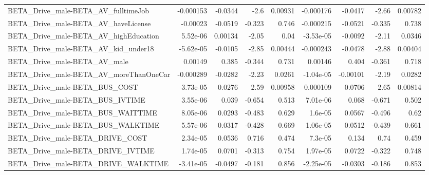 \begin{tabular}{lrrrrrrrr}
BETA\_Drive\_male-BETA\_AV\_fulltimeJob                &   -0.000153 &      -0.0344 &      -2.6 &  0.00931 &  -0.000176 &     -0.0417 &        -2.66 &       0.00782 \\
BETA\_Drive\_male-BETA\_AV\_haveLicense                &    -0.00023 &      -0.0519 &    -0.323 &    0.746 &  -0.000215 &     -0.0521 &       -0.335 &         0.738 \\
BETA\_Drive\_male-BETA\_AV\_highEducation              &    5.52e-06 &      0.00134 &     -2.05 &     0.04 &  -3.53e-05 &     -0.0092 &        -2.11 &        0.0346 \\
BETA\_Drive\_male-BETA\_AV\_kid\_under18                &   -5.62e-05 &      -0.0105 &     -2.85 &  0.00444 &  -0.000243 &     -0.0478 &        -2.88 &       0.00404 \\
BETA\_Drive\_male-BETA\_AV\_male                       &     0.00149 &        0.385 &    -0.344 &    0.731 &    0.00146 &       0.404 &       -0.361 &         0.718 \\
BETA\_Drive\_male-BETA\_AV\_moreThanOneCar             &   -0.000289 &      -0.0282 &     -2.23 &   0.0261 &  -1.04e-05 &    -0.00101 &        -2.19 &        0.0282 \\
BETA\_Drive\_male-BETA\_BUS\_COST                      &    3.73e-05 &       0.0276 &      2.59 &  0.00958 &   0.000109 &      0.0706 &         2.65 &       0.00814 \\
BETA\_Drive\_male-BETA\_BUS\_IVTIME                    &    3.55e-06 &        0.039 &    -0.654 &    0.513 &   7.01e-06 &       0.068 &       -0.671 &         0.502 \\
BETA\_Drive\_male-BETA\_BUS\_WAITTIME                  &    8.05e-06 &       0.0293 &    -0.483 &    0.629 &    1.6e-05 &      0.0567 &       -0.496 &          0.62 \\
BETA\_Drive\_male-BETA\_BUS\_WALKTIME                  &    5.57e-06 &       0.0317 &    -0.428 &    0.669 &   1.06e-05 &      0.0512 &       -0.439 &         0.661 \\
BETA\_Drive\_male-BETA\_DRIVE\_COST                    &    2.34e-05 &       0.0536 &     0.716 &    0.474 &    7.3e-05 &       0.134 &         0.74 &         0.459 \\
BETA\_Drive\_male-BETA\_DRIVE\_IVTIME                  &    1.74e-05 &       0.0701 &    -0.313 &    0.754 &   1.97e-05 &      0.0722 &       -0.322 &         0.748 \\
BETA\_Drive\_male-BETA\_DRIVE\_WALKTIME                &   -3.41e-05 &      -0.0497 &    -0.181 &    0.856 &  -2.25e-05 &     -0.0303 &       -0.186 &         0.853 \\

\end{tabular}

